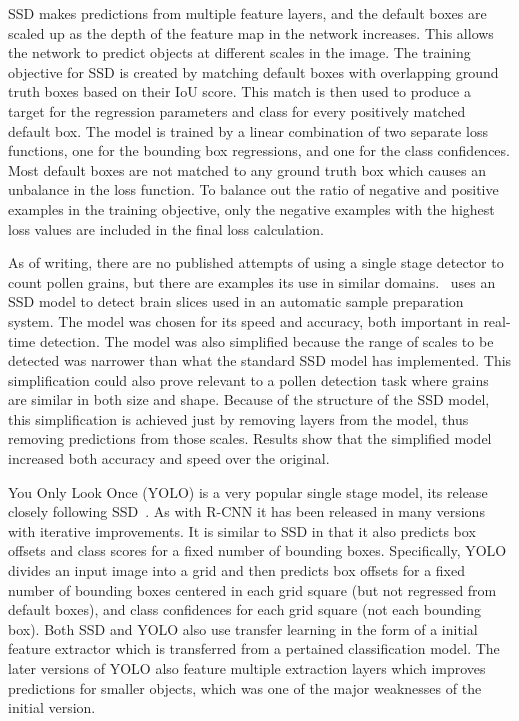 SSD makes predictions from multiple feature layers, and the default boxes are scaled up as the depth of the feature map in the network increases.
This allows the network to predict objects at different scales in the image.
The training objective for SSD is created by matching default boxes with overlapping ground truth boxes based on their IoU score.
This match is then used to produce a target for the regression parameters and class for every positively matched default box.
The model is trained by a linear combination of two separate loss functions, one for the bounding box regressions, and one for the class confidences.
Most default boxes are not matched to any ground truth box which causes an unbalance in the loss function.
To balance out the ratio of negative and positive examples in the training objective, only the negative examples with the highest loss values are included in the final loss calculation.

As of writing, there are no published attempts of using a single stage detector to count pollen grains, but there are examples its use in similar domains.\ \cite{liu_brain_2018} uses an SSD model to detect brain slices used in an automatic sample preparation system.
The model was chosen for its speed and accuracy, both important in real-time detection.
The model was also simplified because the range of scales to be detected was narrower than what the standard SSD model has implemented.
This simplification could also prove relevant to a pollen detection task where grains are similar in both size and shape.
Because of the structure of the SSD model, this simplification is achieved just by removing layers from the model, thus removing predictions from those scales.
Results show that the simplified model increased both accuracy and speed over the original.

You Only Look Once (YOLO) is a very popular single stage model, its release closely following SSD\ \parencite{redmon2016look}.
As with R-CNN it has been released in many versions with iterative improvements.
It is similar to SSD in that it also predicts box offsets and class scores for a fixed number of bounding boxes.
Specifically, YOLO divides an input image into a grid and then predicts box offsets for a fixed number of bounding boxes centered in each grid square (but not regressed from default boxes), and class confidences for each grid square (not each bounding box).
Both SSD and YOLO also use transfer learning in the form of a initial feature extractor which is transferred from a pertained classification model.
The later versions of YOLO also feature multiple extraction layers which improves predictions for smaller objects, which was one of the major weaknesses of the initial version.

